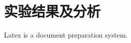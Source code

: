 \cleardoublepage
\chapter{实验结果及分析}

Latex is a document preparation system\cite{lamport1986document}.